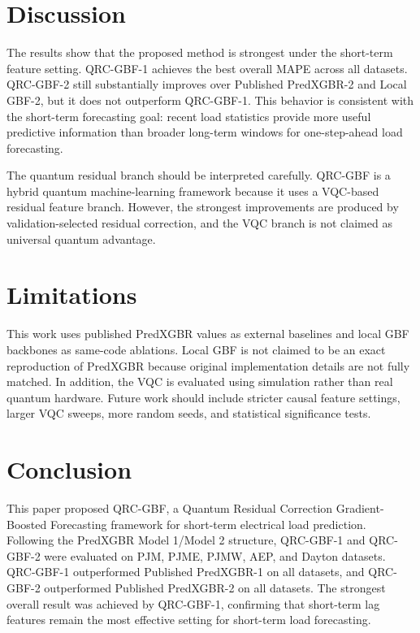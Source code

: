 \documentclass[11pt]{article}
\begin{document}
\section{Discussion}
The results show that the proposed method is strongest under the short-term feature setting. QRC-GBF-1 achieves the best overall MAPE across all datasets. QRC-GBF-2 still substantially improves over Published PredXGBR-2 and Local GBF-2, but it does not outperform QRC-GBF-1. This behavior is consistent with the short-term forecasting goal: recent load statistics provide more useful predictive information than broader long-term windows for one-step-ahead load forecasting.

The quantum residual branch should be interpreted carefully. QRC-GBF is a hybrid quantum machine-learning framework because it uses a VQC-based residual feature branch. However, the strongest improvements are produced by validation-selected residual correction, and the VQC branch is not claimed as universal quantum advantage.

\section{Limitations}
This work uses published PredXGBR values as external baselines and local GBF backbones as same-code ablations. Local GBF is not claimed to be an exact reproduction of PredXGBR because original implementation details are not fully matched. In addition, the VQC is evaluated using simulation rather than real quantum hardware. Future work should include stricter causal feature settings, larger VQC sweeps, more random seeds, and statistical significance tests.

\section{Conclusion}
This paper proposed QRC-GBF, a Quantum Residual Correction Gradient-Boosted Forecasting framework for short-term electrical load prediction. Following the PredXGBR Model 1/Model 2 structure, QRC-GBF-1 and QRC-GBF-2 were evaluated on PJM, PJME, PJMW, AEP, and Dayton datasets. QRC-GBF-1 outperformed Published PredXGBR-1 on all datasets, and QRC-GBF-2 outperformed Published PredXGBR-2 on all datasets. The strongest overall result was achieved by QRC-GBF-1, confirming that short-term lag features remain the most effective setting for short-term load forecasting.



\end{document}
